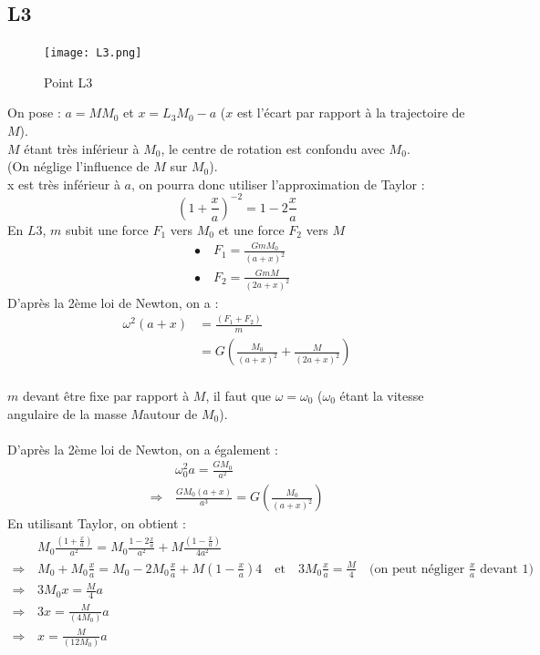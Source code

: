 \documentclass[12pt]{article}
\begin{document}
\subsection{L3}
\begin{figure}[H]
\centering
\texttt{[image: L3.png]}
\caption{Point L3}
\end{figure}
On pose : $a = MM_0$ et $x=L_3M_0-a$ ($x$ est l'écart par rapport à la trajectoire de $M$). \\
$M$ étant très inférieur à $M_0$, le centre de rotation est confondu avec $M_0$. \\
(On néglige l'influence de $M$ sur $M_0$). \\
x est très inférieur à $a$, on pourra donc utiliser l'approximation de Taylor :\\
$$\left(1+ \frac{x}{a}\right)^{-2} = 1 - 2 \frac{x}{a}$$
En $L3$, $m$ subit une force $F_1$ vers $M_0$ et une force $F_2$ vers $M$\\
\begin{align*}
&\bullet \quad F_1 = \frac{GmM_0}{(a+x)^2}\\
&\bullet \quad F_2 = \frac{GmM}{(2a+x)^2}
\end{align*}
\newpage
D'après la 2ème loi de Newton, on a : \\
\begin{align*}
\omega^2 (a + x) &= \frac{(F_1 + F_2 )}{m} \\
&= G\left(\frac{M_0}{(a+x)^2}+\frac{M}{(2a+x)^2}\right)
\end{align*} \\
$m$ devant être fixe par rapport à $M$, il faut que $\omega = \omega_0$ ($\omega_0$ étant la vitesse angulaire de la masse $M$autour de $M_0$).\\ \\
D'après la 2ème loi de Newton, on a également : 
\begin{align*}
&\omega_0^2a = \frac{GM_0}{a^2} \\
\Rightarrow \, &\frac{GM_0(a+x)}{a^3} = G\left(\frac{M_0}{(a+x)^2}\right)
\end{align*} 
En utilisant Taylor, on obtient : 
\begin{align*}
&M_0 \frac{(1 + \frac{x}{a})}{a^2}= M_0\frac{1 - 2 \frac{x}{a}}{a^2} + M\frac{(1 - \frac{x}{a})}{4a^2} \\
\Rightarrow \, &M_0 + M_0 \frac{x}{a} = M_0 - 2M_0 \frac{x}{a} + M(1 - \frac{x}{a})4 \quad \text{et} \quad 3M_0 \frac{x}{a} = \frac{M}{4} \quad \text{(on peut négliger }\frac{x}{a} \text{ devant }1\text{)} \\
\Rightarrow \, &3M_0x = \frac{M}{4}a \\
\Rightarrow \, &3 x = \frac{M}{(4M_0)}a \\
\Rightarrow \, &\boxed{x=\frac{M}{(12M_0)}a}
\end{align*} \\
\end{document}
